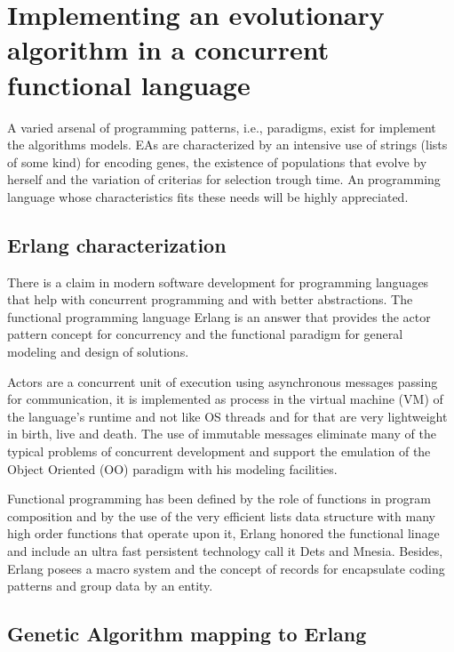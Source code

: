 \documentclass{acm_proc_article-sp}
\begin{document}
\section{Implementing an evolutionary algorithm in a concurrent functional language}
\label{sec:evo}

A varied arsenal of programming patterns, i.e., paradigms, exist for implement the algorithms models. EAs are characterized by an intensive use of strings (lists of some kind) for encoding genes, the existence of populations that evolve by herself and the variation of criterias for selection trough time. An programming language whose characteristics fits these needs will be highly appreciated.

\subsection{Erlang characterization}

There is a claim in modern software development for programming languages that help with concurrent programming and with better abstractions. The functional programming language Erlang is an answer that provides the actor pattern concept for concurrency and the functional paradigm for general modeling and design of solutions.

Actors are a concurrent unit of execution using asynchronous messages passing for communication, it is implemented as process in the virtual machine (VM) of the language's runtime and not like OS threads and for that are very lightweight in birth, live and death. The use of immutable messages eliminate many of the typical problems of concurrent development and support the emulation of the Object Oriented (OO) paradigm with his modeling facilities.

Functional programming has been defined by the role of functions in program composition and by the use of the very efficient lists data structure with many high order functions that operate upon it, Erlang honored the functional linage and include an ultra fast persistent technology call it Dets and Mnesia. Besides, Erlang posees a macro system and the concept of records for encapsulate coding patterns and group data by an entity.



\subsection{Genetic Algorithm mapping to Erlang}
\end{document}
